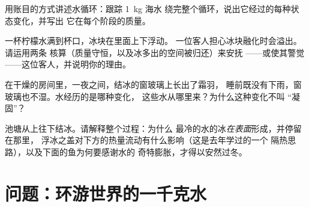 \begin{exercise}[$\star\star$]\label{exo:g6:water-states:9}
用账目的方式讲述水循环：跟踪 \qty{1}{kg} 海水
绕完整个循环，说出它经过的每种状态变化，并写出
它在每个阶段的质量。
\end{exercise}

\begin{exercise}[$\star\star$]\label{exo:g6:water-states:10}
一杯柠檬水满到杯口，冰块在里面上下浮动。
一位客人担心冰块融化时会溢出。请运用两条
核算（质量守恒，以及冰多出的空间被归还）来安抚
——或使其警觉——这位客人，并说明你的理由。
\end{exercise}

\begin{exercise}[$\star\star$]\label{exo:g6:water-states:11}
在干燥的房间里，一夜之间，结冰的窗玻璃上长出了霜羽，
睡前既没有下雨，窗玻璃也不湿。水经历的是哪种变化，
这些水从哪里来？为什么这种变化不叫
“凝固”？
\end{exercise}

\begin{exercise}[$\star\star\star$]\label{exo:g6:water-states:12}
池塘从上往下结冰。请解释整个过程：为什么
最冷的水的冰\emph{在表面}形成，并停留在那里，
浮冰之盖对下方的热量流动有什么影响（这是去年学过的一个
隔热思路），以及下面的鱼为何要感谢水的
奇特膨胀，才得以安然过冬。
\end{exercise}

\section{问题：环游世界的一千克水}

